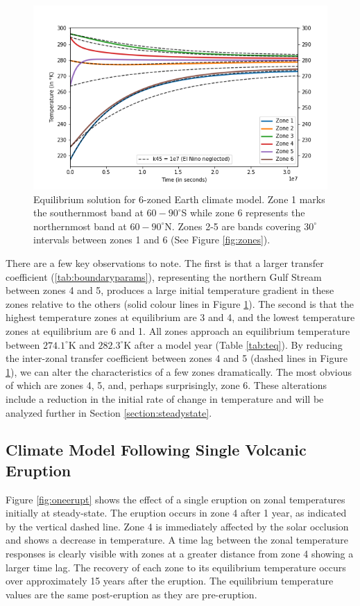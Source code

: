 \documentclass[12pt]{article}
\begin{document}
\begin{figure}[H]
    \centering
    \includegraphics[scale=0.5]{Question2.png}
    \caption{
        Equilibrium solution for 6-zoned Earth climate model. Zone 1 marks the
        southernmost band at $60-90^{\circ}$S while zone 6 represents the
        northernmost band at $60-90^{\circ}$N. Zones 2-5 are bands covering
        $30^{\circ}$ intervals between zones 1 and 6
        (See Figure \ref{fig:zones}).
    }
    \label{fig:steadystate}
\end{figure}
\FloatBarrier

There are a few key observations to note. The first is that a larger transfer
coefficient (\ref{tab:boundaryparams}), representing the northern Gulf Stream
between zones 4 and 5, produces a large initial temperature gradient in these
zones relative to the others (solid colour lines in Figure
\ref{fig:steadystate}). The second is that the highest temperature zones at
equilibrium are 3 and 4, and the lowest temperature zones at equilibrium are 6
and 1. All zones approach an equilibrium temperature between $274.1^{\circ}$K
and $282.3^{\circ}$K after a model year (Table \ref{tab:teq}). By reducing the
inter-zonal transfer coefficient between zones 4 and 5
(dashed lines in Figure \ref{fig:steadystate}), we can alter the characteristics
of a few zones dramatically. The most obvious of which are zones 4, 5, and,
perhaps surprisingly, zone 6. These alterations include a reduction in the
initial rate of change in temperature and will be analyzed further in Section
\ref{section:steadystate}.

\subsection{Climate Model Following Single Volcanic Eruption}
Figure \ref{fig:oneerupt} shows the effect of a single eruption on zonal 
temperatures initially at steady-state. The eruption occurs in zone 4 after
1 year, as indicated by the vertical dashed line.
Zone 4 is immediately affected by the solar occlusion and shows a decrease
in temperature. A time lag between the zonal temperature responses is clearly
visible with zones at a greater distance from zone 4 showing a larger time lag.
The recovery of each zone to its equilibrium temperature occurs over approximately
15 years after the eruption. The equilibrium temperature values are the same
post-eruption as they are pre-eruption.
\end{document}

